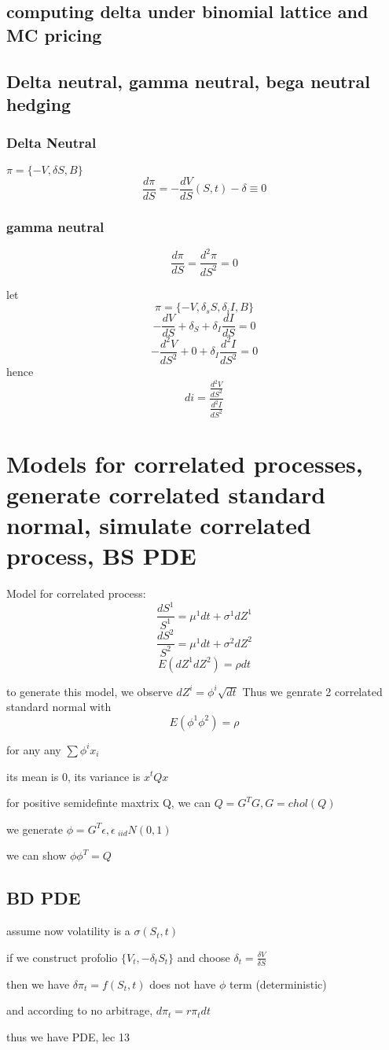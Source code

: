 \documentclass[10pt]{article}
\theoremstyle{break}
\begin{document}
\subsection{computing delta under binomial lattice and MC pricing}
\subsection{Delta neutral, gamma neutral, bega neutral hedging}
    \subsubsection{Delta Neutral}
        $\pi=\{-V, \delta S, B\}$
        $$\frac{d\pi}{dS}=-\frac{dV}{dS}(S,t)-\delta\equiv 0$$

    \subsubsection{gamma neutral}
        $$\frac{d\pi}{dS}=\frac{d^2\pi}{dS^2}=0$$

        let $$\pi=\{-V, \delta_s S,\delta_i I, B\}$$
        $$-\frac{dV}{dS}+\delta_S+\delta_I\frac{dI}{dS}=0$$
        $$-\frac{d^2V}{dS^2}+0+\delta_I\frac{d^2I}{dS^2}=0$$
        hence $$di=\frac{\frac{d^2V}{dS^2}}{\frac{d^2I}{dS^2}}$$
    

\section{Models for correlated processes, generate correlated standard normal, simulate correlated process, BS PDE}

    Model for correlated process: 
    $$\frac{dS^1}{S^1}=\mu^1dt+\sigma^1dZ^1$$
    $$\frac{dS^2}{S^2}=\mu^1dt+\sigma^2dZ^2$$
    $$E(dZ^1dZ^2)=\rho dt$$

    to generate this model, we observe $dZ^i=\phi^i\sqrt{dt}$
    Thus we genrate 2 correlated standard normal with $$E(\phi^1 \phi^2)= \rho$$



    for any any $\sum \phi^ix_i$

    its mean is 0, its variance is $x^tQx$

    for positive semidefinte maxtrix Q, we can $Q=G^TG, G=chol(Q)$

    we generate $\phi=G^T\epsilon, \epsilon~_{iid}N(0,1)$

    we can show $\phi \phi^T = Q$

    \subsection{BD PDE}

    assume now volatility is a $\sigma(S_t, t)$

    if we construct profolio $\{V_t, -\delta_tS_t\}$ and choose $\delta_t=\frac{\delta V}{\delta S}$

    then we have $\delta \pi_t = f(S_t, t)$ does not have $\phi$ term (deterministic)

    and according to no arbitrage, $d\pi_t = r\pi_tdt$

    thus we have PDE, lec 13

 
\end{document}
